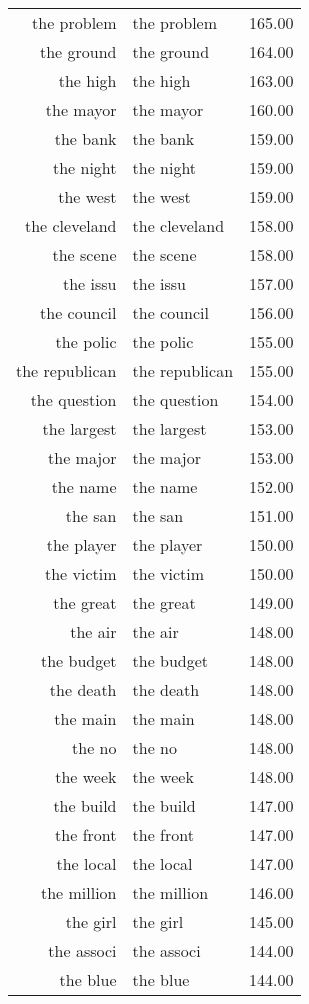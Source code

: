 \begin{table}[ht]
\begin{tabular}{rlr}
  the problem & the problem & 165.00 \\ 
  the ground & the ground & 164.00 \\ 
  the high & the high & 163.00 \\ 
  the mayor & the mayor & 160.00 \\ 
  the bank & the bank & 159.00 \\ 
  the night & the night & 159.00 \\ 
  the west & the west & 159.00 \\ 
  the cleveland & the cleveland & 158.00 \\ 
  the scene & the scene & 158.00 \\ 
  the issu & the issu & 157.00 \\ 
  the council & the council & 156.00 \\ 
  the polic & the polic & 155.00 \\ 
  the republican & the republican & 155.00 \\ 
  the question & the question & 154.00 \\ 
  the largest & the largest & 153.00 \\ 
  the major & the major & 153.00 \\ 
  the name & the name & 152.00 \\ 
  the san & the san & 151.00 \\ 
  the player & the player & 150.00 \\ 
  the victim & the victim & 150.00 \\ 
  the great & the great & 149.00 \\ 
  the air & the air & 148.00 \\ 
  the budget & the budget & 148.00 \\ 
  the death & the death & 148.00 \\ 
  the main & the main & 148.00 \\ 
  the no & the no & 148.00 \\ 
  the week & the week & 148.00 \\ 
  the build & the build & 147.00 \\ 
  the front & the front & 147.00 \\ 
  the local & the local & 147.00 \\ 
  the million & the million & 146.00 \\ 
  the girl & the girl & 145.00 \\ 
  the associ & the associ & 144.00 \\ 
  the blue & the blue & 144.00 \\ 

\end{tabular}
\end{table}
